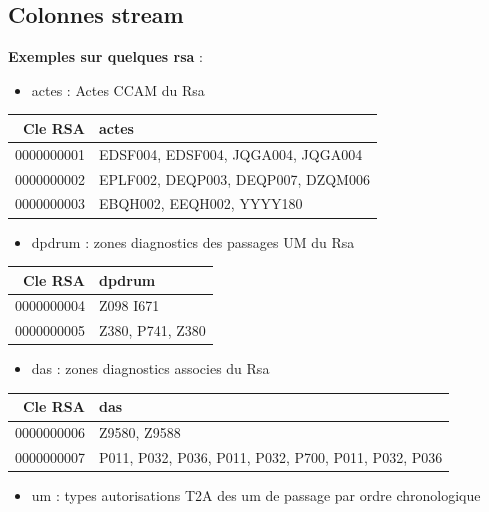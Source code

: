 \documentclass[
]{book}
\providecommand{\tightlist}{%
  \setlength{\itemsep}{0pt}\setlength{\parskip}{0pt}}
\begin{document}
\hypertarget{colonnes-stream}{%
\subsection{Colonnes stream}\label{colonnes-stream}}

\textbf{Exemples sur quelques rsa} :

\begin{itemize}
\tightlist
\item
  actes : Actes CCAM du Rsa
\end{itemize}

\begin{longtable}[]{@{}rl@{}}
\toprule()
Cle RSA & actes \\
\midrule()
\endhead
0000000001 & EDSF004, EDSF004, JQGA004, JQGA004 \\
0000000002 & EPLF002, DEQP003, DEQP007, DZQM006 \\
0000000003 & EBQH002, EEQH002, YYYY180 \\
\bottomrule()
\end{longtable}

\begin{itemize}
\tightlist
\item
  dpdrum : zones diagnostics des passages UM du Rsa
\end{itemize}

\begin{longtable}[]{@{}rl@{}}
\toprule()
Cle RSA & dpdrum \\
\midrule()
\endhead
0000000004 & Z098 I671 \\
0000000005 & Z380, P741, Z380 \\
\bottomrule()
\end{longtable}

\begin{itemize}
\tightlist
\item
  das : zones diagnostics associes du Rsa
\end{itemize}

\begin{longtable}[]{@{}rl@{}}
\toprule()
Cle RSA & das \\
\midrule()
\endhead
0000000006 & Z9580, Z9588 \\
0000000007 & P011, P032, P036, P011, P032, P700, P011, P032, P036 \\
\bottomrule()
\end{longtable}

\begin{itemize}
\tightlist
\item
  um : types autorisations T2A des um de passage par ordre chronologique
\end{itemize}
\end{document}
